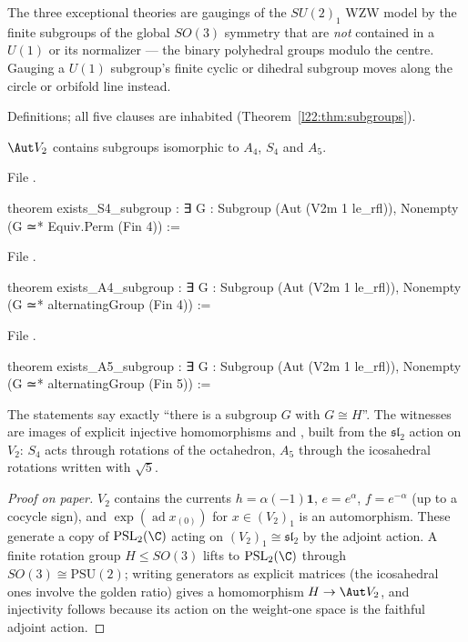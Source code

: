 \begin{physics}
The three exceptional theories are gaugings of the $SU(2)_1$ WZW model by the finite subgroups of the
global $SO(3)$ symmetry that are \emph{not} contained in a $U(1)$ or its normalizer --- the binary polyhedral
groups modulo the centre. Gauging a $U(1)$ subgroup's finite cyclic or dihedral subgroup moves along the
circle or orbifold line instead.
\end{physics}

\begin{status}
Definitions; all five clauses are inhabited (Theorem~\ref{l22:thm:subgroups}).
\end{status}

\begin{theorem}\label{l22:thm:subgroups}
$\Aut V_2$ contains subgroups isomorphic to $A_4$, $S_4$ and $A_5$.
\end{theorem}
\noindent File .
\begin{leancode}
theorem exists_S4_subgroup :
    ∃ G : Subgroup (Aut (V2m 1 le_rfl)), Nonempty (G ≃* Equiv.Perm (Fin 4)) :=
\end{leancode}
\noindent File .
\begin{leancode}
theorem exists_A4_subgroup :
    ∃ G : Subgroup (Aut (V2m 1 le_rfl)), Nonempty (G ≃* alternatingGroup (Fin 4)) :=
\end{leancode}
\noindent File .
\begin{leancode}
theorem exists_A5_subgroup :
    ∃ G : Subgroup (Aut (V2m 1 le_rfl)), Nonempty (G ≃* alternatingGroup (Fin 5)) :=
\end{leancode}

\begin{dictionary}
The statements say exactly ``there is a subgroup $G$ with $G\cong H$''. The witnesses are images of explicit
injective homomorphisms  and , built from the
$\mathfrak{sl}_2$ action on $V_2$: $S_4$ acts through rotations of the octahedron, $A_5$ through the icosahedral
rotations written with $\sqrt5$.
\end{dictionary}

\begin{proof}[Proof on paper]
$V_2$ contains the currents $h=\alpha(-1)\mathbf 1$, $e=e^{\alpha}$, $f=e^{-\alpha}$ (up to a cocycle sign), and
$\exp(\operatorname{ad}x_{(0)})$ for $x\in (V_2)_1$ is an automorphism. These generate a copy of $\mathrm{PSL}_2(\C)$
acting on $(V_2)_1\cong\mathfrak{sl}_2$ by the adjoint action. A finite rotation group $H\le SO(3)$ lifts to
$\mathrm{PSL}_2(\C)$ through $SO(3)\cong \mathrm{PSU}(2)$; writing generators as explicit matrices (the
icosahedral ones involve the golden ratio) gives a homomorphism $H\to\Aut V_2$, and injectivity follows
because its action on the weight-one space is the faithful adjoint action.
\end{proof}

